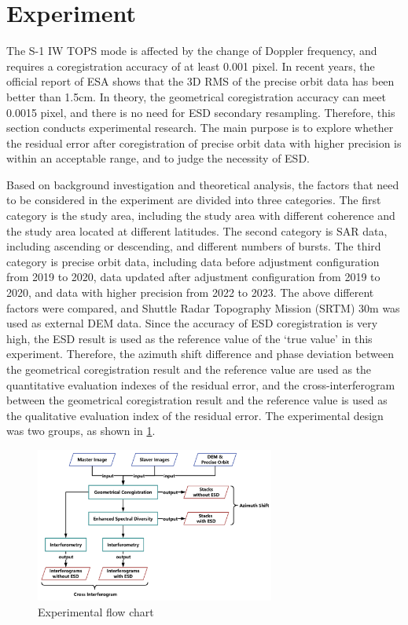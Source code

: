 \documentclass[preprint, authoryear]{elsarticle}
\begin{document}
\section{Experiment}

The S-1 IW TOPS mode is affected by the change of Doppler frequency, and requires a coregistration accuracy of at least 0.001 pixel. In recent years, the official report of ESA shows that the 3D RMS of the precise orbit data has been better than 1.5cm. In theory, the geometrical coregistration accuracy can meet 0.0015 pixel, and there is no need for ESD secondary resampling. Therefore, this section conducts experimental research. The main purpose is to explore whether the residual error after coregistration of precise orbit data with higher precision is within an acceptable range, and to judge the necessity of ESD. \par

Based on background investigation and theoretical analysis, the factors that need to be considered in the experiment are divided into three categories. The first category is the study area, including the study area with different coherence and the study area located at different latitudes. The second category is SAR data, including ascending or descending, and different numbers of bursts. The third category is precise orbit data, including data before adjustment configuration from 2019 to 2020, data updated after adjustment configuration from 2019 to 2020, and data with higher precision from 2022 to 2023. The above different factors were compared, and Shuttle Radar Topography Mission (SRTM) 30m was used as external DEM data. Since the accuracy of ESD coregistration is very high, the ESD result is used as the reference value of the ‘true value’ in this experiment. Therefore, the azimuth shift difference and phase deviation between the geometrical coregistration result and the reference value are used as the quantitative evaluation indexes of the residual error, and the cross-interferogram between the geometrical coregistration result and the reference value is used as the qualitative evaluation index of the residual error. The experimental design was two groups, as shown in \ref{fig_3}. \par

\begin{figure}
	\centering
	\includegraphics[width=0.7\textwidth]{figure/Experimental flow chart.png}
	\caption{Experimental flow chart}
	\label{fig_3}%
\end{figure}
\end{document}
